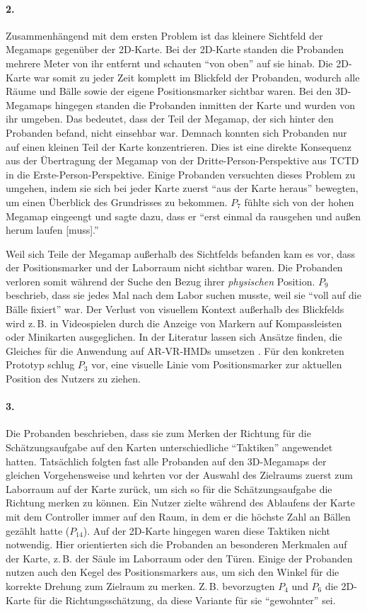 \paragraph{2.}
Zusammenhängend mit dem ersten Problem ist das kleinere Sichtfeld der Megamaps gegenüber der 2D-Karte.
Bei der 2D-Karte standen die Probanden mehrere Meter von ihr entfernt und schauten \enquote{von oben} auf sie hinab.
Die 2D-Karte war somit zu jeder Zeit komplett im Blickfeld der Probanden, wodurch alle Räume und Bälle sowie der eigene Positionsmarker sichtbar waren.
Bei den 3D-Megamaps hingegen standen die Probanden inmitten der Karte und wurden von ihr umgeben.
Das bedeutet, dass der Teil der Megamap, der sich hinter den Probanden befand, nicht einsehbar war.
Demnach konnten sich Probanden nur auf einen kleinen Teil der Karte konzentrieren.
Dies ist eine direkte Konsequenz aus der Übertragung der Megamap von der Dritte-Person-Perspektive aus TCTD in die Erste-Person-Perspektive.
Einige Probanden versuchten dieses Problem zu umgehen, indem sie sich bei jeder Karte zuerst \enquote{aus der Karte heraus} bewegten, um einen Überblick des Grundrisses zu bekommen.
$P_7$ fühlte sich von der hohen Megamap eingeengt und sagte dazu, dass er \enquote{erst einmal da rausgehen und außen herum laufen [muss].}

Weil sich Teile der Megamap außerhalb des Sichtfelds befanden kam es vor, dass der Positionsmarker und der Laborraum nicht sichtbar waren.
Die Probanden verloren somit während der Suche den Bezug ihrer \emph{physischen} Position.
$P_9$ beschrieb, dass sie jedes Mal nach dem Labor suchen musste, weil sie \enquote{voll auf die Bälle fixiert} war.
Der Verlust von visuellem Kontext außerhalb des Blickfelds wird z.\,B. in Videospielen durch die Anzeige von Markern auf Kompassleisten oder Minikarten ausgeglichen.
In der Literatur lassen sich Ansätze finden, die Gleiches für die Anwendung auf AR-VR-HMDs umsetzen \autocites{Lin2017a}{Gruenefeld2017}.
Für den konkreten Prototyp schlug $P_3$ vor, eine visuelle Linie vom Positionsmarker zur aktuellen Position des Nutzers zu ziehen.

\paragraph{3.}
Die Probanden beschrieben, dass sie zum Merken der Richtung für die Schätzungsaufgabe auf den Karten unterschiedliche \enquote{Taktiken} angewendet hatten.
Tatsächlich folgten fast alle Probanden auf den 3D-Megamaps der gleichen Vorgehensweise und kehrten vor der Auswahl des Zielraums zuerst zum Laborraum auf der Karte zurück, um sich so für die Schätzungsaufgabe die Richtung merken zu können.
Ein Nutzer zielte während des Ablaufens der Karte mit dem Controller immer auf den Raum, in dem er die höchste Zahl an Bällen gezählt hatte ($P_{14}$).
Auf der 2D-Karte hingegen waren diese Taktiken nicht notwendig.
Hier orientierten sich die Probanden an besonderen Merkmalen auf der Karte, z.\,B. der Säule im Laborraum oder den Türen.
Einige der Probanden nutzen auch den Kegel des Positionsmarkers aus, um sich den Winkel für die korrekte Drehung zum Zielraum zu merken.
Z.\,B. bevorzugten $P_4$ und $P_6$ die 2D-Karte für die Richtungsschätzung, da diese Variante für sie \enquote{gewohnter} sei.

